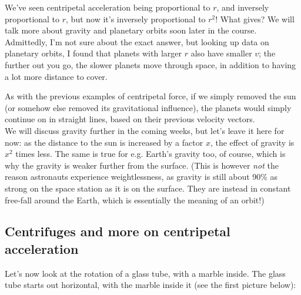 \documentclass[8.01x]{subfiles}
\begin{document}
We've seen centripetal acceleration being proportional to $r$, and inversely proportional to $r$, but now it's inversely proportional to $r^2$! What gives? We will talk more about gravity and planetary orbits soon later in the course. Admittedly, I'm not sure about the exact answer, but looking up data on planetary orbits, I found that planets with larger $r$ also have smaller $v$; the further out you go, the slower planets move through space, in addition to having a lot more distance to cover.

As with the previous examples of centripetal force, if we simply removed the sun (or somehow else removed its gravitational influence), the planets would simply continue on in straight lines, based on their previous velocity vectors.\\
We will discuss gravity further in the coming weeks, but let's leave it here for now: as the distance to the sun is increased by a factor $x$, the effect of gravity is $x^2$ times less. The same is true for e.g. Earth's gravity too, of course, which is why the gravity is weaker further from the surface. (This is however \emph{not} the reason astronauts experience weightlessness, as gravity is still about 90\% as strong on the space station as it is on the surface. They are instead in constant free-fall around the Earth, which is essentially the meaning of an orbit!)

\subsection{Centrifuges and more on centripetal acceleration}

Let's now look at the rotation of a glass tube, with a marble inside. The glass tube starts out horizontal, with the marble inside it (see the first picture below):
\end{document}
